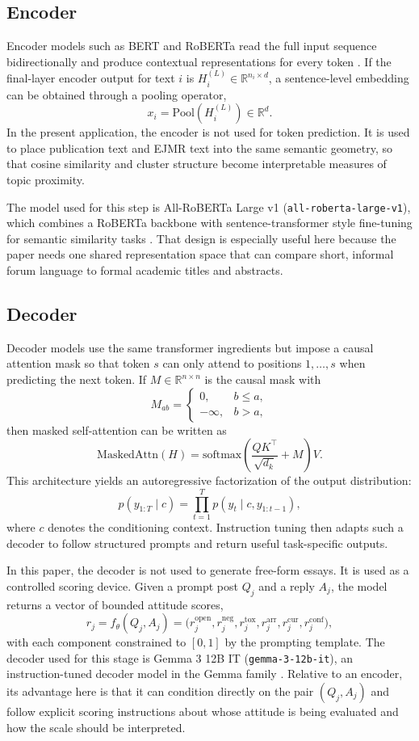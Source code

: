 \documentclass[11pt]{article}
\begin{document}
\subsection{Encoder}

Encoder models such as BERT and RoBERTa read the full input sequence bidirectionally and produce contextual representations for every token \citep{devlin2019bert,liu2019roberta}. If the final-layer encoder output for text $i$ is $H_i^{(L)} \in \mathbb{R}^{n_i \times d}$, a sentence-level embedding can be obtained through a pooling operator,
\[
x_i = \mathrm{Pool}\!\left(H_i^{(L)}\right) \in \mathbb{R}^{d}.
\]
In the present application, the encoder is not used for token prediction. It is used to place publication text and EJMR text into the same semantic geometry, so that cosine similarity and cluster structure become interpretable measures of topic proximity.

The model used for this step is All-RoBERTa Large v1 (\texttt{all-roberta-large-v1}), which combines a RoBERTa backbone with sentence-transformer style fine-tuning for semantic similarity tasks \citep{liu2019roberta,reimers2019}. That design is especially useful here because the paper needs one shared representation space that can compare short, informal forum language to formal academic titles and abstracts.

\subsection{Decoder}

Decoder models use the same transformer ingredients but impose a causal attention mask so that token $s$ can only attend to positions $1,\dots,s$ when predicting the next token. If $M \in \mathbb{R}^{n\times n}$ is the causal mask with
\[
M_{ab}=
\begin{cases}
0, & b \le a,\\
-\infty, & b>a,
\end{cases}
\]
then masked self-attention can be written as
\[
\mathrm{MaskedAttn}(H)
=
\mathrm{softmax}\!\left(
\frac{QK^\top}{\sqrt{d_k}} + M
\right)V.
\]
This architecture yields an autoregressive factorization of the output distribution:
\[
p(y_{1:T}\mid c)
=
\prod_{t=1}^{T} p(y_t \mid c, y_{1:t-1}),
\]
where $c$ denotes the conditioning context. Instruction tuning then adapts such a decoder to follow structured prompts and return useful task-specific outputs.

In this paper, the decoder is not used to generate free-form essays. It is used as a controlled scoring device. Given a prompt post $Q_j$ and a reply $A_j$, the model returns a vector of bounded attitude scores,
\[
r_j = f_{\theta}(Q_j,A_j)
=
\big(r_j^{\mathrm{open}}, r_j^{\mathrm{neg}}, r_j^{\mathrm{tox}}, r_j^{\mathrm{arr}}, r_j^{\mathrm{cur}}, r_j^{\mathrm{conf}}\big),
\]
with each component constrained to $[0,1]$ by the prompting template. The decoder used for this stage is Gemma 3 12B IT (\texttt{gemma-3-12b-it}), an instruction-tuned decoder model in the Gemma family \citep{gemmateam2025}. Relative to an encoder, its advantage here is that it can condition directly on the pair $(Q_j,A_j)$ and follow explicit scoring instructions about whose attitude is being evaluated and how the scale should be interpreted.
\end{document}

